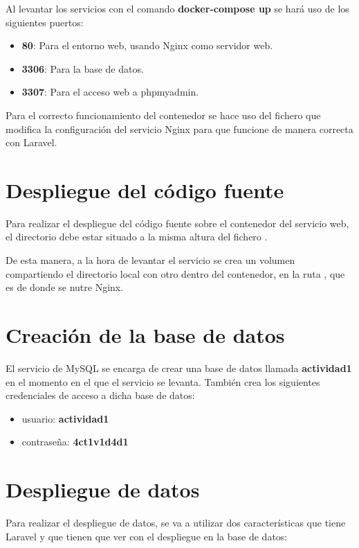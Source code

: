 \documentclass{\ClassPath/viu-tfm-template}
\begin{document}
Al levantar los servicios con el comando \textbf{docker-compose up} se hará uso de los siguientes puertos:
\vspace{-1em}
\begin{itemize}
    \item \textbf{80}: Para el entorno web, usando Nginx como servidor web.
    \item \textbf{3306}: Para la base de datos.
    \item \textbf{3307}: Para el acceso web a phpmyadmin.
\end{itemize}
\vspace{-1em}

Para el correcto funcionamiento del contenedor se hace uso del fichero  que modifica la configuración del servicio Nginx para que funcione de manera correcta con Laravel.

\section{Despliegue del código fuente}
Para realizar el despliegue del código fuente sobre el contenedor del servicio web, el directorio  debe estar situado a la misma altura del fichero .

De esta manera, a la hora de levantar el servicio se crea un volumen compartiendo el directorio local  con otro dentro del contenedor, en la ruta , que es de donde se nutre Nginx.


\section{Creación de la base de datos}

El servicio de MySQL se encarga de crear una base de datos llamada \textbf{actividad1} en el momento en el que el servicio se levanta. También crea los siguientes credenciales de acceso a dicha base de datos:

\vspace{-1em}
\begin{itemize}
    \item usuario:  \textbf{actividad1}
    \item contraseña:  \textbf{4ct1v1d4d1}
\end{itemize}
\vspace{-1em}

\section{Despliegue de datos}
Para realizar el despliegue de datos, se va a utilizar dos características que tiene Laravel y que tienen que ver con el despliegue en la base de datos:
\end{document}
